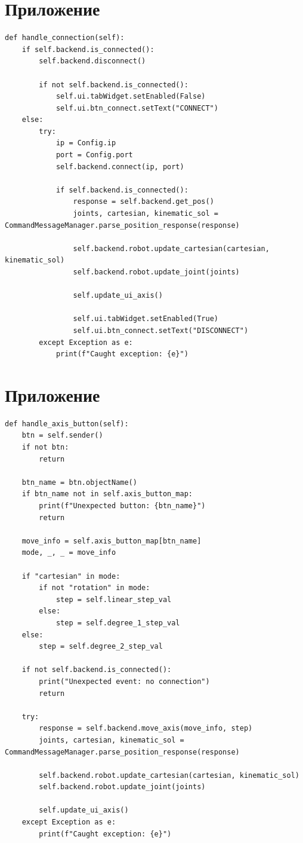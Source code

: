 \documentclass[a4paper,14pt]{extarticle}
\begin{document}
\section{Приложение}
\begin{lstlisting}[label=lst:hancon, caption={Реализация обработки нажатия на кнопку connect/disconnect в интерфейсе.}]
def handle_connection(self):
    if self.backend.is_connected():
        self.backend.disconnect()

        if not self.backend.is_connected():
            self.ui.tabWidget.setEnabled(False)
            self.ui.btn_connect.setText("CONNECT")
    else:
        try:
            ip = Config.ip
            port = Config.port
            self.backend.connect(ip, port)

            if self.backend.is_connected():
                response = self.backend.get_pos()
                joints, cartesian, kinematic_sol = CommandMessageManager.parse_position_response(response)

                self.backend.robot.update_cartesian(cartesian, kinematic_sol)
                self.backend.robot.update_joint(joints)

                self.update_ui_axis()

                self.ui.tabWidget.setEnabled(True)
                self.ui.btn_connect.setText("DISCONNECT")
        except Exception as e:
            print(f"Caught exception: {e}")
\end{lstlisting}


\section{Приложение}
\begin{lstlisting}[label=lst:hab, caption={Реализация функции обработки нажатия кнопок изменения координат.}]
def handle_axis_button(self):
    btn = self.sender()
    if not btn:
        return

    btn_name = btn.objectName()
    if btn_name not in self.axis_button_map:
        print(f"Unexpected button: {btn_name}")
        return

    move_info = self.axis_button_map[btn_name]
    mode, _, _ = move_info

    if "cartesian" in mode:
        if not "rotation" in mode:
            step = self.linear_step_val
        else:
            step = self.degree_1_step_val
    else:
        step = self.degree_2_step_val

    if not self.backend.is_connected():
        print("Unexpected event: no connection")
        return

    try:
        response = self.backend.move_axis(move_info, step)
        joints, cartesian, kinematic_sol = CommandMessageManager.parse_position_response(response)

        self.backend.robot.update_cartesian(cartesian, kinematic_sol)
        self.backend.robot.update_joint(joints)

        self.update_ui_axis()
    except Exception as e:
        print(f"Caught exception: {e}")
\end{lstlisting}
\end{document}
